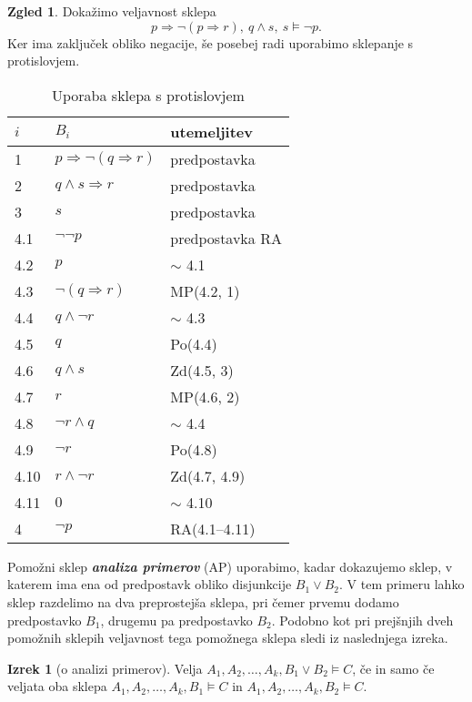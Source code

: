 \documentclass[11pt]{book}
\def\definicija{\color{rdeca}\bf\em}
\theoremstyle{definition}
\theoremstyle{zgled}
\newtheorem*{zgled}{Zgled}
\theoremstyle{odprtproblem}
\theoremstyle{domacanaloga}
\theoremstyle{izrek}
\newtheorem*{izrek}{Izrek}
\begin{document}
\begin{zgled}
Dokažimo veljavnost sklepa
\[
    p \Rightarrow \lnot (p \Rightarrow r), \ q \land s, \ s \models \lnot p.
\]
Ker ima zaključek obliko negacije, še posebej radi uporabimo sklepanje s protislovjem.

\begin{table}[h]
    \centering
    \begin{tabular}{lll}
        $i$ & $B_i$ & utemeljitev \\ \hline
        1 & $p \Rightarrow \lnot(q \Rightarrow r)$ & predpostavka \\
        2 & $q \land s \Rightarrow r$ & predpostavka \\
        3 & $s$ & predpostavka \\
        4.1 & $\lnot \lnot p$ & predpostavka RA \\
        4.2 & $p$ & $\sim$ 4.1 \\
        4.3 & $\lnot (q \Rightarrow r)$ & MP(4.2, 1) \\
        4.4 & $q \land \lnot r$ & $\sim$ 4.3 \\
        4.5 & $q$ & Po(4.4) \\
        4.6 & $q \land s$ & Zd(4.5, 3) \\
        4.7 & $r$ & MP(4.6, 2) \\
        4.8 & $\lnot r \land q$ & $\sim$ 4.4 \\
        4.9 & $\lnot r$ & Po(4.8) \\
        4.10 & $r \land \lnot r$ & Zd(4.7, 4.9) \\
        4.11 & $0$ & $\sim$ 4.10 \\
        4 & \underline{$\lnot p$} & RA(4.1--4.11) \\
    \end{tabular}
    \caption{Uporaba sklepa s protislovjem}
\end{table}
\end{zgled}

Pomožni sklep {\definicija analiza primerov} (AP) uporabimo, kadar dokazujemo sklep, v katerem ima ena od predpostavk obliko disjunkcije $B_1 \lor B_2$. V tem primeru lahko sklep razdelimo na dva preprostejša sklepa, pri čemer prvemu dodamo predpostavko $B_1$, drugemu pa predpostavko $B_2$. Podobno kot pri prejšnjih dveh pomožnih sklepih veljavnost tega pomožnega sklepa sledi iz naslednjega izreka.

\begin{izrek}[o analizi primerov]
Velja $A_1, A_2, \dots, A_k, B_1 \lor B_2 \models C$, če in samo če veljata oba sklepa $A_1, A_2, \dots, A_k, B_1 \models C$ in $A_1, A_2, \dots, A_k, B_2 \models C$.
\end{izrek}
\end{document}
